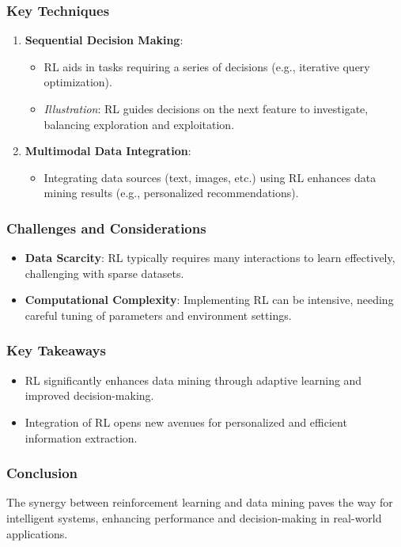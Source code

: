 \documentclass[aspectratio=169]{beamer}
\begin{document}
\begin{frame}[fragile]
    \frametitle{Key Techniques}
    \begin{enumerate}
        \item \textbf{Sequential Decision Making}:
        \begin{itemize}
            \item RL aids in tasks requiring a series of decisions (e.g., iterative query optimization).
            \item \textit{Illustration}: RL guides decisions on the next feature to investigate, balancing exploration and exploitation.
        \end{itemize}
        \item \textbf{Multimodal Data Integration}:
        \begin{itemize}
            \item Integrating data sources (text, images, etc.) using RL enhances data mining results (e.g., personalized recommendations).
        \end{itemize}
    \end{enumerate}
\end{frame}

\begin{frame}[fragile]
    \frametitle{Challenges and Considerations}
    \begin{itemize}
        \item \textbf{Data Scarcity}: RL typically requires many interactions to learn effectively, challenging with sparse datasets.
        \item \textbf{Computational Complexity}: Implementing RL can be intensive, needing careful tuning of parameters and environment settings.
    \end{itemize}
\end{frame}

\begin{frame}[fragile]
    \frametitle{Key Takeaways}
    \begin{itemize}
        \item RL significantly enhances data mining through adaptive learning and improved decision-making.
        \item Integration of RL opens new avenues for personalized and efficient information extraction.
    \end{itemize}
\end{frame}

\begin{frame}[fragile]
    \frametitle{Conclusion}
    The synergy between reinforcement learning and data mining paves the way for intelligent systems, enhancing performance and decision-making in real-world applications.
\end{frame}
\end{document}
